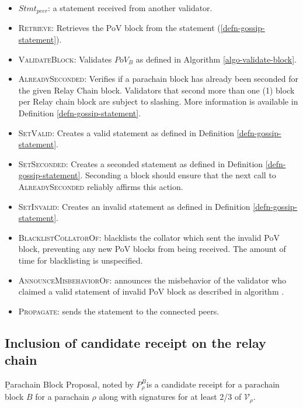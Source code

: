 \begin{itemize}
  \item $Stmt_{peer}$: a statement received from another validator.
  \item \textsc{Retrieve}: Retrieves the PoV block from the statement
  (\ref{defn-gossip-statement}).
  \item \textsc{ValidateBlock}: Validates $PoV_B$ as defined in Algorithm
  \ref{algo-validate-block}.
  \item \textsc{AlreadySeconded}: Verifies if a parachain block has already been
  seconded for the given Relay Chain block. Validators that second more than one
  (1) block per Relay chain block are subject to slashing. More information is
  available in Definition \ref{defn-gossip-statement}.
  \item \textsc{SetValid}: Creates a valid statement as defined in Definition
  \ref{defn-gossip-statement}.
  \item \textsc{SetSeconded}: Creates a seconded statement as defined in
  Definition \ref{defn-gossip-statement}. Seconding a block should ensure that
  the next call to \textsc{AlreadySeconded} reliably affirms this action.
  \item \textsc{SetInvalid}: Creates an invalid statement as defined in
  Definition \ref{defn-gossip-statement}.
  \item \textsc{BlacklistCollatorOf}: blacklists the collator which sent the
  invalid PoV block, preventing any new PoV blocks from being received. The
  amount of time for blacklisting is unspecified.
  \item \textsc{AnnounceMisbehaviorOf}: announces the misbehavior of the
  validator who claimed a valid statement of invalid PoV block as described in
  algorithm .
  \item \textsc{Propagate}: sends the statement to the connected peers.
\end{itemize}

\subsection{Inclusion of candidate receipt on the relay chain}\label{sect-inclusion-of-candidate-receipt}

\begin{definition}
  \label{defn-para-proposal}
        {\b Parachain Block Proposal}, noted by $P^B_{\rho}$is a candidate receipt for a parachain block $B$ for a parachain $\rho$ along with signatures for at least 2/3 of $\mathcal{V}_\rho$.  %

\end{definition}

